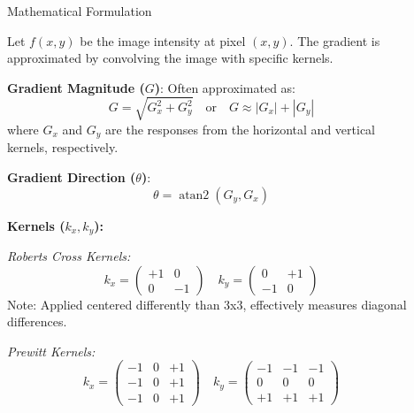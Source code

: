 \documentclass[final]{beamer}
\newlength{\sepwidth}
\newlength{\colwidth}
\newcommand{\separatorcolumn}{\begin{column}{\sepwidth}\end{column}}
\begin{document}
\begin{frame}[t]
\begin{columns}[t]
\begin{column}{\colwidth}
\end{column} %



\separatorcolumn 

\begin{column}{\colwidth}

  \begin{block}{Mathematical Formulation} \setlength{\parskip}{1pt} \linespread{1.0}

    Let $f(x, y)$ be the image intensity at pixel $(x, y)$. The gradient is approximated by convolving the image with specific kernels.

    \textbf{Gradient Magnitude ($G$)}: Often approximated as:
    \begin{equation*}
        G = \sqrt{G_x^2 + G_y^2} \quad \text{or} \quad G \approx |G_x| + |G_y|
    \end{equation*}
    where $G_x$ and $G_y$ are the responses from the horizontal and vertical kernels, respectively.

    \textbf{Gradient Direction ($\theta$)}:
    \begin{equation*}
        \theta = \operatorname{atan2}(G_y, G_x)
    \end{equation*}

    \textbf{Kernels ($k_x, k_y$):}

    \textit{Roberts Cross Kernels:}
    \begin{equation*}
    k_x = \begin{pmatrix} +1 & 0 \\ 0 & -1 \end{pmatrix} \quad
    k_y = \begin{pmatrix} 0 & +1 \\ -1 & 0 \end{pmatrix}
    \end{equation*}
    Note: Applied centered differently than 3x3, effectively measures diagonal differences.

    \textit{Prewitt Kernels:}
    \begin{equation*}
    k_x = \begin{pmatrix} -1 & 0 & +1 \\ -1 & 0 & +1 \\ -1 & 0 & +1 \end{pmatrix} \quad
    k_y = \begin{pmatrix} -1 & -1 & -1 \\ 0 & 0 & 0 \\ +1 & +1 & +1 \end{pmatrix}
    \end{equation*}


\end{block}
\end{column}
\end{columns}
\end{frame}
\end{document}
